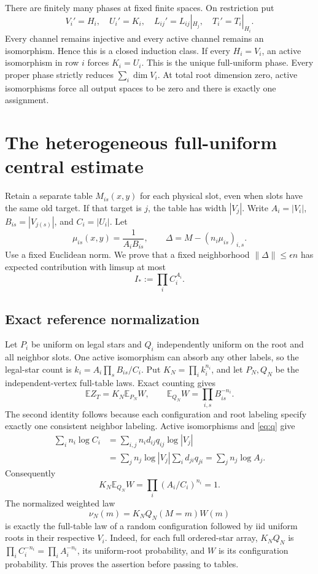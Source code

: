\documentclass[11pt]{article}
\newcommand{\E}{\mathbb E}
\begin{document}
There are finitely many phases at fixed finite spaces. On restriction put
\begin{equation}\label{eq:restriction}
 V_i'=H_i,\quad U_i'=K_i,\quad L_{ij}'=L_{ij}|_{H_j},\quad T_i'=T_i|_{H_i}.
\end{equation}
Every channel remains injective and every active channel remains an isomorphism. Hence this is a closed induction class. If every $H_i=V_i$, an active isomorphism in row $i$ forces $K_i=U_i$. This is the unique full-uniform phase. Every proper phase strictly reduces $\sum_i\dim V_i$. At total root dimension zero, active isomorphisms force all output spaces to be zero and there is exactly one assignment.

\section{The heterogeneous full-uniform central estimate}
Retain a separate table $M_{is}(x,y)$ for each physical slot, even when slots have the same old target. If that target is $j$, the table has width $|V_j|$. Write $A_i=|V_i|$, $B_{is}=|V_{j(s)}|$, and $C_i=|U_i|$. Let
\[
 \mu_{is}(x,y)=\frac1{A_iB_{is}},\qquad
 \Delta=M-(n_i\mu_{is})_{i,s}.
\]
Use a fixed Euclidean norm. We prove that a fixed neighborhood $\|\Delta\|\le\epsilon n$ has expected contribution with limsup at most
\begin{equation}\label{eq:index}
 I_*:=\prod_i C_i^{A_i}.
\end{equation}

\subsection*{Exact reference normalization}
Let $P_i$ be uniform on legal stars and $Q_i$ independently uniform on the root and all neighbor slots. One active isomorphism can absorb any other labels, so the legal-star count is $k_i=A_i\prod_sB_{is}/C_i$. Put $K_N=\prod_i k_i^{n_i}$, and let $P_N,Q_N$ be the independent-vertex full-table laws. Exact counting gives
\begin{equation}\label{eq:normalizers}
 \E Z_T=K_N\E_{P_N}W,\qquad
 \E_{Q_N}W=\prod_{i,s}B_{is}^{-n_i}.
\end{equation}
The second identity follows because each configuration and root labeling specify exactly one consistent neighbor labeling. Active isomorphisms and \eqref{eq:q} give
\begin{align*}
 \sum_i n_i\log C_i
 &=\sum_{i,j}n_id_{ij}q_{ij}\log|V_j|\\
 &=\sum_jn_j\log|V_j|\sum_i d_{ji}q_{ji}
 =\sum_jn_j\log A_j.
\end{align*}
Consequently
\begin{equation}\label{eq:exactone}
 K_N\E_{Q_N}W=\prod_i(A_i/C_i)^{n_i}=1.
\end{equation}
The normalized weighted law
\[
 \nu_N(m)=K_NQ_N(M=m)W(m)
\]
is exactly the full-table law of a random configuration followed by iid uniform roots in their respective $V_i$. Indeed, for each full ordered-star array, $K_NQ_N$ is $\prod_i C_i^{-n_i}=\prod_i A_i^{-n_i}$, its uniform-root probability, and $W$ is its configuration probability. This proves the assertion before passing to tables.
\end{document}
